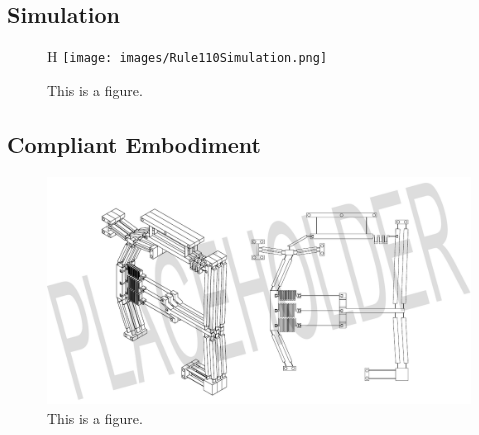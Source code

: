 \subsection*{Simulation}



\begin{figure}{H}
    \centering
    \texttt{[image: images/Rule110Simulation.png]}
    \caption{This is a figure.}
    \label{fig:Simulation}
\end{figure}


\subsection*{Compliant Embodiment}

\begin{figure}
    \centering
    \includegraphics[width=\textwidth]{images/SVGs/v5Assembly.pdf}
    \caption{This is a figure.}
    \label{fig:Prototype}
\end{figure}
